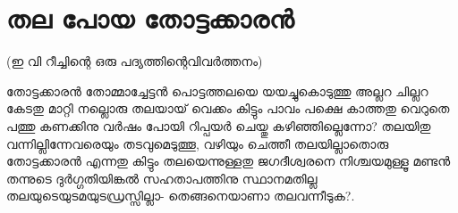 \chapter{തല പോയ തോട്ടക്കാരൻ}
\obeylines
\noindent
(ഇ വി റീച്ചിന്റെ ഒരു പദ്യത്തിന്റെവിവർത്തനം)

തോട്ടക്കാരൻ തോമ്മാച്ചേട്ടൻ
പൊട്ടത്തലയെ യയച്ചുകൊടുത്തു
അല്ലറ ചില്ലറ കേടതു മാറ്റി
നല്ലൊരു തലയായ് വെക്കം കിട്ടും
പാവം പക്ഷെ കാത്തതു വെറുതെ
പത്തു കണക്കിനു വർഷം പോയി
റിപ്പയർ ചെയ്തു കഴിഞ്ഞില്ലെന്നോ?
തലയിതു വന്നില്ലിന്നേവരെയും
തടവുമെടുത്തൂ, വഴിയും ചെത്തീ
തലയില്ലാതൊരു തോട്ടക്കാരൻ
എന്നതു കിട്ടും തലയെന്നുള്ളതു
ജഗദീശ്വരനെ നിശ്ചയമുള്ളൂ
മണ്ടൻ തന്നുടെ ദുർഗ്ഗതിയിങ്കൽ
സഹതാപത്തിനു സ്ഥാനമതില്ല
തലയുടെയുടമയുടഡ്രസ്സില്ലാ-
തെങ്ങനെയാണാ തലവന്നീടുക?.
